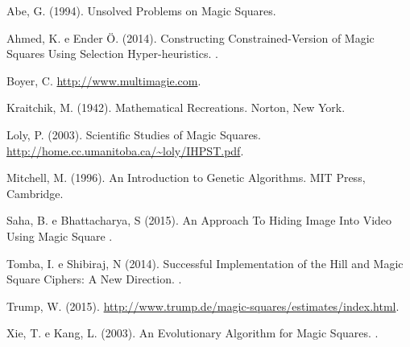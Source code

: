 \documentclass[italian,twoside,twocolumn]{article}
\begin{document}

\begin{thebibliography}{99} 
	
Abe, G. (1994).
\newblock Unsolved Problems on Magic Squares.

Ahmed, K. e Ender Ö. (2014).
\newblock Constructing Constrained-Version of Magic Squares Using Selection Hyper-heuristics.
.

Boyer, C. 
\newblock \url{http://www.multimagie.com}.

Kraitchik, M. (1942).
\newblock Mathematical Recreations.
\newblock Norton, New York.

Loly, P. (2003).
\newblock Scientific Studies of Magic Squares.
\newblock \url{http://home.cc.umanitoba.ca/~loly/IHPST.pdf}.

Mitchell, M. (1996).
\newblock An Introduction to Genetic Algorithms.
\newblock MIT Press, Cambridge.

Saha, B. e Bhattacharya, S (2015).
\newblock An Approach To Hiding Image Into Video  Using Magic Square
.

Tomba, I. e Shibiraj, N (2014).
\newblock Successful Implementation of the Hill and Magic Square Ciphers: A New Direction.
.

Trump, W. (2015).
\newblock \url{http://www.trump.de/magic-squares/estimates/index.html}.

Xie, T. e Kang, L. (2003).
\newblock An Evolutionary Algorithm for Magic Squares.
.
 
\end{thebibliography}



\onecolumn
\end{document}
